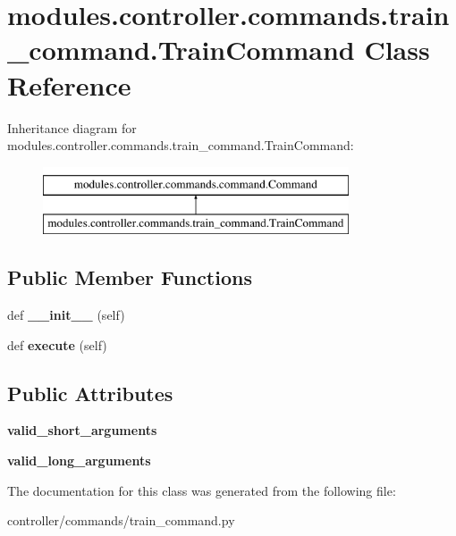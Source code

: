 \hypertarget{classmodules_1_1controller_1_1commands_1_1train__command_1_1_train_command}{}\section{modules.\+controller.\+commands.\+train\+\_\+command.\+Train\+Command Class Reference}
\label{classmodules_1_1controller_1_1commands_1_1train__command_1_1_train_command}
Inheritance diagram for modules.\+controller.\+commands.\+train\+\_\+command.\+Train\+Command\+:\begin{figure}[H]
\begin{center}
\leavevmode
\includegraphics[height=2.000000cm]{classmodules_1_1controller_1_1commands_1_1train__command_1_1_train_command}
\end{center}
\end{figure}
\subsection*{Public Member Functions}
\begin{DoxyCompactItemize}
\item 
\mbox{\label{classmodules_1_1controller_1_1commands_1_1train__command_1_1_train_command_a0f1babed0387698beca400b8add14688}} 
def {\bfseries \+\_\+\+\_\+init\+\_\+\+\_\+} (self)
\item 
\mbox{\label{classmodules_1_1controller_1_1commands_1_1train__command_1_1_train_command_a5a8a02925c5627c5c6438dd5a2dfd27f}} 
def {\bfseries execute} (self)
\end{DoxyCompactItemize}
\subsection*{Public Attributes}
\begin{DoxyCompactItemize}
\item 
\mbox{\label{classmodules_1_1controller_1_1commands_1_1train__command_1_1_train_command_aa041e94abaf0fc9318d7d1957205a43f}} 
{\bfseries valid\+\_\+short\+\_\+arguments}
\item 
\mbox{\label{classmodules_1_1controller_1_1commands_1_1train__command_1_1_train_command_a4f6da9d06babc3bcc769f83eceb35c4c}} 
{\bfseries valid\+\_\+long\+\_\+arguments}
\end{DoxyCompactItemize}


The documentation for this class was generated from the following file\+:\begin{DoxyCompactItemize}
\item 
controller/commands/train\+\_\+command.\+py\end{DoxyCompactItemize}
